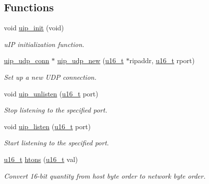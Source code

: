 \subsection*{Functions}
\begin{CompactItemize}
\item 
void \hyperlink{a00059_gc48ed5f0d27721ef62a3ed02a5ad8d2e}{uip\_\-init} (void)
\begin{CompactList}\small\item\em u\-IP initialization function. \item\end{CompactList}\item 
\hyperlink{a00032}{uip\_\-udp\_\-conn} $\ast$ \hyperlink{a00059_g527ff0e535266167077b06d3a4742822}{uip\_\-udp\_\-new} (\hyperlink{a00070_gfc6499c1f28697aa3bfc2804d496fd11}{u16\_\-t} $\ast$ripaddr, \hyperlink{a00070_gfc6499c1f28697aa3bfc2804d496fd11}{u16\_\-t} rport)
\begin{CompactList}\small\item\em Set up a new UDP connection. \item\end{CompactList}\item 
void \hyperlink{a00059_gaa585784b0914cac1d37f07f85457008}{uip\_\-unlisten} (\hyperlink{a00070_gfc6499c1f28697aa3bfc2804d496fd11}{u16\_\-t} port)
\begin{CompactList}\small\item\em Stop listening to the specified port. \item\end{CompactList}\item 
void \hyperlink{a00059_gdd1ab3704ecd4900eec61a6897d32dc8}{uip\_\-listen} (\hyperlink{a00070_gfc6499c1f28697aa3bfc2804d496fd11}{u16\_\-t} port)
\begin{CompactList}\small\item\em Start listening to the specified port. \item\end{CompactList}\item 
\hyperlink{a00070_gfc6499c1f28697aa3bfc2804d496fd11}{u16\_\-t} \hyperlink{a00059_ga22b04cac8cf283ca12f028578bebc06}{htons} (\hyperlink{a00070_gfc6499c1f28697aa3bfc2804d496fd11}{u16\_\-t} val)
\begin{CompactList}\small\item\em Convert 16-bit quantity from host byte order to network byte order. \item\end{CompactList}\end{CompactItemize}
